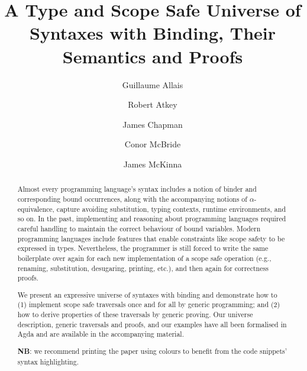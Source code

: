\documentclass[format=acmsmall, screen=true]{acmart}
\begin{document}
\title[A Type and Scope Safe Universe of Syntaxes with Binding]{A Type and Scope Safe Universe of Syntaxes with Binding, Their Semantics and Proofs}
\author{Guillaume Allais}
\author{Robert Atkey}
\author{James Chapman}
\author{Conor McBride}
\author{James McKinna}

\begin{abstract}
Almost every programming language's syntax includes a notion of binder
and corresponding bound occurrences, along with the accompanying
notions of $\alpha$-equivalence, capture avoiding substitution, typing
contexts, runtime environments, and so on. In the past, implementing
and reasoning about programming languages required careful handling to
maintain the correct behaviour of bound variables. Modern programming
languages include features that enable constraints like scope safety
to be expressed in types. Nevertheless, the programmer is still forced
to write the same boilerplate over again for each new implementation
of a scope safe operation (e.g., renaming, substitution, desugaring,
printing, etc.), and then again for correctness proofs.

We present an expressive universe of syntaxes with binding and
demonstrate how to (1) implement scope safe traversals once and for
all by generic programming; and (2) how to derive properties of these
traversals by generic proving. Our universe description, generic
traversals and proofs, and our examples have all been formalised in
Agda and are available in the accompanying material.

\textbf{NB}: we recommend printing the paper using colours to benefit
from the code snippets' syntax highlighting.
\end{abstract}


%
%
\begin{CCSXML}

\end{CCSXML}

\end{document}
